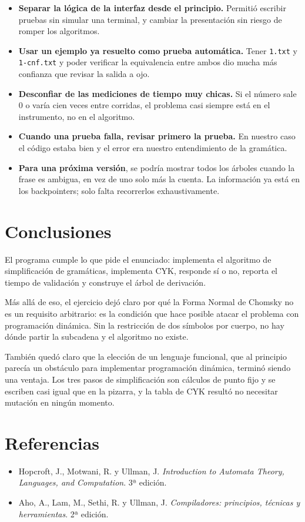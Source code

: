 \documentclass[11pt,a4paper]{article}
\begin{document}
\begin{itemize}[leftmargin=*]
  \item \textbf{Separar la lógica de la interfaz desde el principio.} Permitió
  escribir pruebas sin simular una terminal, y cambiar la presentación sin
  riesgo de romper los algoritmos.
  \item \textbf{Usar un ejemplo ya resuelto como prueba automática.}
  Tener \texttt{1.txt} y \texttt{1-cnf.txt} y poder verificar la equivalencia
  entre ambos dio mucha más confianza que revisar la salida a ojo.
  \item \textbf{Desconfiar de las mediciones de tiempo muy chicas.} Si el
  número sale 0 o varía cien veces entre corridas, el problema casi siempre
  está en el instrumento, no en el algoritmo.
  \item \textbf{Cuando una prueba falla, revisar primero la prueba.} En nuestro
  caso el código estaba bien y el error era nuestro entendimiento de la
  gramática.
  \item \textbf{Para una próxima versión}, se podría mostrar todos los árboles
  cuando la frase es ambigua, en vez de uno solo más la cuenta. La información
  ya está en los backpointers; solo falta recorrerlos exhaustivamente.
\end{itemize}

\section{Conclusiones}

El programa cumple lo que pide el enunciado: implementa el algoritmo de
simplificación de gramáticas, implementa CYK, responde sí o no, reporta el
tiempo de validación y construye el árbol de derivación.

Más allá de eso, el ejercicio dejó claro por qué la Forma Normal de Chomsky no
es un requisito arbitrario: es la condición que hace posible atacar el problema
con programación dinámica. Sin la restricción de dos símbolos por cuerpo, no
hay dónde partir la subcadena y el algoritmo no existe.

También quedó claro que la elección de un lenguaje funcional, que al principio
parecía un obstáculo para implementar programación dinámica, terminó siendo
una ventaja. Los tres pasos de simplificación son cálculos de punto fijo y se
escriben casi igual que en la pizarra, y la tabla de CYK resultó no necesitar
mutación en ningún momento.

\section{Referencias}

\begin{itemize}[leftmargin=*]
  \item Hopcroft, J., Motwani, R. y Ullman, J. \textit{Introduction to Automata
  Theory, Languages, and Computation}. 3ª edición.
  \item Aho, A., Lam, M., Sethi, R. y Ullman, J. \textit{Compiladores:
  principios, técnicas y herramientas}. 2ª edición.
\end{itemize}
\end{document}
